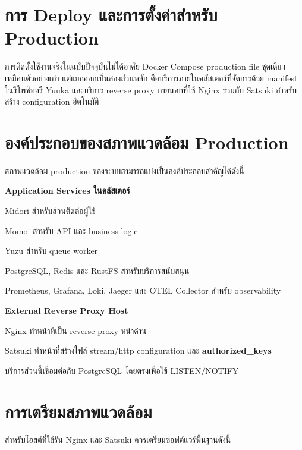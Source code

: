 \section{การ Deploy และการตั้งค่าสำหรับ Production}
\hspace*{1.3em}
การติดตั้งใช้งานจริงในฉบับปัจจุบันไม่ได้อาศัย Docker Compose production file ชุดเดียวเหมือนตัวอย่างเก่า แต่แยกออกเป็นสองส่วนหลัก คือบริการภายในคลัสเตอร์ที่จัดการด้วย manifest ในรีโพซิทอรี Yuuka และบริการ reverse proxy ภายนอกที่ใช้ Nginx ร่วมกับ Satsuki สำหรับสร้าง configuration อัตโนมัติ

\section{องค์ประกอบของสภาพแวดล้อม Production}
\hspace*{1.3em}
สภาพแวดล้อม production ของระบบสามารถแบ่งเป็นองค์ประกอบสำคัญได้ดังนี้

\begin{mycustomenum2}
    \item \textbf{Application Services ในคลัสเตอร์}
    \begin{mycustomenum2}
        \item Midori สำหรับส่วนติดต่อผู้ใช้
        \item Momoi สำหรับ API และ business logic
        \item Yuzu สำหรับ queue worker
        \item PostgreSQL, Redis และ RustFS สำหรับบริการสนับสนุน
        \item Prometheus, Grafana, Loki, Jaeger และ OTEL Collector สำหรับ observability
    \end{mycustomenum2}
    \item \textbf{External Reverse Proxy Host}
    \begin{mycustomenum2}
        \item Nginx ทำหน้าที่เป็น reverse proxy หน้าด่าน
        \item Satsuki ทำหน้าที่สร้างไฟล์ stream/http configuration และ \textbf{authorized\_keys}
        \item บริการส่วนนี้เชื่อมต่อกับ PostgreSQL โดยตรงเพื่อใช้ LISTEN/NOTIFY
    \end{mycustomenum2}
\end{mycustomenum2}

\section{การเตรียมสภาพแวดล้อม}
\hspace*{1.3em}
สำหรับโฮสต์ที่ใช้รัน Nginx และ Satsuki ควรเตรียมซอฟต์แวร์พื้นฐานดังนี้

